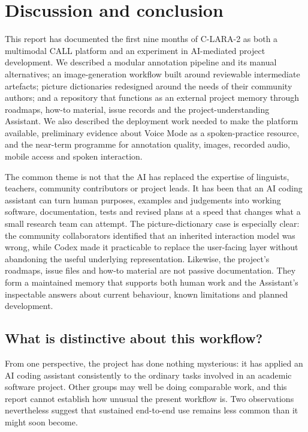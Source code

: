 \section{Discussion and conclusion}

This report has documented the first nine months of C-LARA-2 as both a
multimodal CALL platform and an experiment in AI-mediated project development.
We described a modular annotation pipeline and its manual alternatives; an
image-generation workflow built around reviewable intermediate artefacts;
picture dictionaries redesigned around the needs of their community authors;
and a repository that functions as an external project memory through roadmaps,
how-to material, issue records and the project-understanding Assistant. We
also described the deployment work needed to make the platform available,
preliminary evidence about Voice Mode as a spoken-practice resource, and the
near-term programme for annotation quality, images, recorded audio, mobile
access and spoken interaction.

The common theme is not that the AI has replaced the expertise of linguists,
teachers, community contributors or project leads. It has been that an AI
coding assistant can turn human purposes, examples and judgements into
working software, documentation, tests and revised plans at a speed that
changes what a small research team can attempt. The picture-dictionary case is
especially clear: the community collaborators identified that an inherited
interaction model was wrong, while Codex made it practicable to replace the
user-facing layer without abandoning the useful underlying representation.
Likewise, the project's roadmaps, issue files and how-to material are not
passive documentation. They form a maintained memory that supports both
human work and the Assistant's inspectable answers about current behaviour,
known limitations and planned development.

\subsection{What is distinctive about this workflow?}

From one perspective, the project has done nothing mysterious: it has applied
an AI coding assistant consistently to the ordinary tasks involved in an
academic software project. Other groups may well be doing comparable work, and
this report cannot establish how unusual the present workflow is. Two
observations nevertheless suggest that sustained end-to-end use remains less
common than it might soon become.

